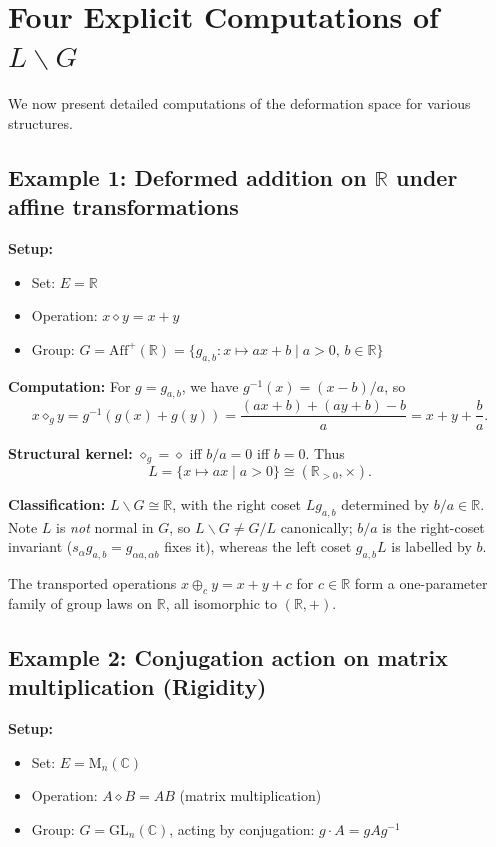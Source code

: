 \documentclass[11pt,a4paper]{article}
\begin{document}
	\section{Four Explicit Computations of $L\backslash G$}
	
	We now present detailed computations of the deformation space for various structures.
	
	\subsection{Example 1: Deformed addition on $\mathbb{R}$ under affine transformations}
	
	\textbf{Setup:}
	\begin{itemize}[nosep]
		\item Set: $E = \mathbb{R}$
		\item Operation: $x \diamond y = x + y$
		\item Group: $G = \mathrm{Aff}^+(\mathbb{R}) = \{ g_{a,b}: x \mapsto ax + b \mid a > 0,\, b \in \mathbb{R} \}$
	\end{itemize}
	
	\textbf{Computation:} For $g = g_{a,b}$, we have $g^{-1}(x) = (x-b)/a$, so
	\[
	x \diamond_g y = g^{-1}(g(x) + g(y)) = \frac{(ax+b) + (ay+b) - b}{a} = x + y + \frac{b}{a}.
	\]
	
	\textbf{Structural kernel:} $\diamond_g = \diamond$ iff $b/a = 0$ iff $b = 0$. Thus
	\[
	L = \{ x \mapsto ax \mid a > 0 \} \cong (\mathbb{R}_{>0}, \times).
	\]
	
	\textbf{Classification:} $L\backslash G \cong \mathbb{R}$, with the right coset $L g_{a,b}$ determined by $b/a \in \mathbb{R}$. Note $L$ is \emph{not} normal in $G$, so $L\backslash G \neq G/L$ canonically; $b/a$ is the right-coset invariant ($s_\alpha g_{a,b} = g_{\alpha a, \alpha b}$ fixes it), whereas the left coset $g_{a,b}L$ is labelled by $b$.
	
	The transported operations $x \oplus_c y = x + y + c$ for $c \in \mathbb{R}$ form a one-parameter family of group laws on $\mathbb{R}$, all isomorphic to $(\mathbb{R}, +)$.
	
	\subsection{Example 2: Conjugation action on matrix multiplication (Rigidity)}
	
	\textbf{Setup:}
	\begin{itemize}[nosep]
		\item Set: $E = \mathrm{M}_n(\mathbb{C})$
		\item Operation: $A \diamond B = AB$ (matrix multiplication)
		\item Group: $G = \mathrm{GL}_n(\mathbb{C})$, acting by conjugation: $g \cdot A = gAg^{-1}$
	\end{itemize}
	
\end{document}
